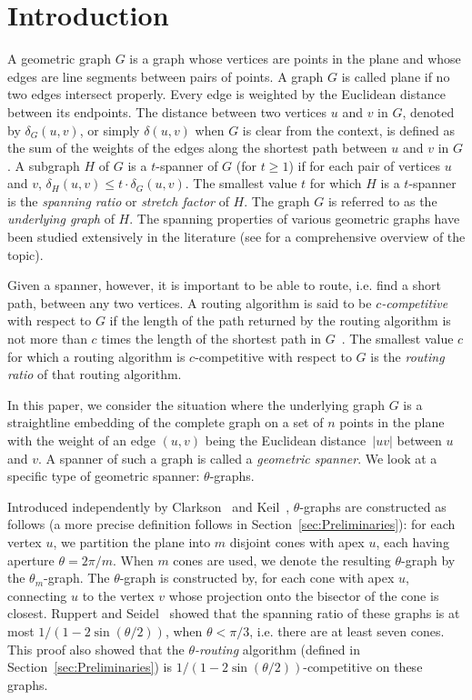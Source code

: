 \documentclass[12pt]{article}
\begin{document}
\section{Introduction}
A geometric graph $G$ is a graph whose vertices are points in the plane and whose edges are line segments between pairs of points. A graph $G$ is called plane if no two edges intersect properly. Every edge is weighted by the Euclidean distance between its endpoints. The distance between two vertices $u$ and $v$ in $G$, denoted by $\delta_G(u, v)$, or simply $\delta(u, v)$ when $G$ is clear from the context, is defined as the sum of the weights of the edges along the shortest path between $u$ and $v$ in $G$. A subgraph $H$ of $G$ is a $t$-spanner of $G$ (for $t\geq 1$) if for each pair of vertices $u$ and $v$, $\delta_H(u, v) \leq t \cdot \delta_G(u, v)$. The smallest value $t$ for which $H$ is a $t$-spanner is the \emph{spanning ratio} or \emph{stretch factor} of $H$. The graph $G$ is referred to as the {\em underlying graph} of $H$. The spanning properties of various geometric graphs have been studied extensively in the literature (see \cite{BS11,NS-GSN-06} for a comprehensive overview of the topic). 

Given a spanner, however, it is important to be able to route, i.e. find a short path, between any two vertices. A routing algorithm is said to be \emph{$c$-competitive} with respect to $G$ if the length of the path returned by the routing algorithm is not more than $c$ times the length of the shortest path in $G$~\cite{BFRV12}. The smallest value $c$ for which a routing algorithm is $c$-competitive with respect to $G$ is the \emph{routing ratio} of that routing algorithm. 

In this paper, we consider the situation where the underlying graph $G$ is a straightline embedding of the complete graph on a set of $n$ points in the plane with the weight of an edge $(u,v)$ being the Euclidean distance~$|u v|$ between $u$ and $v$. A spanner of such a graph is called a \emph{geometric spanner}. We look at a specific type of geometric spanner: $\theta$-graphs. 

Introduced independently by Clarkson~\cite{Cl87} and Keil~\cite{Keil88}, $\theta$-graphs are constructed as follows (a more precise definition follows in Section~\ref{sec:Preliminaries}): for each vertex $u$, we partition the plane into $m$ disjoint cones with apex $u$, each having aperture $\theta = 2 \pi/m$. When $m$ cones are used, we denote the resulting $\theta$-graph by the $\theta_m$-graph. The $\theta$-graph is constructed by, for each cone with apex $u$, connecting $u$ to the vertex $v$ whose projection onto the bisector of the cone is closest. Ruppert and Seidel~\cite{RS91} showed that the spanning ratio of these graphs is at most $1/(1 - 2 \sin (\theta/2))$, when $\theta < \pi/3$, i.e. there are at least seven cones. This proof also showed that the \emph{$\theta$-routing} algorithm (defined in Section~\ref{sec:Preliminaries}) is $1/(1 - 2 \sin (\theta/2))$-competitive on these graphs. 
\end{document}
